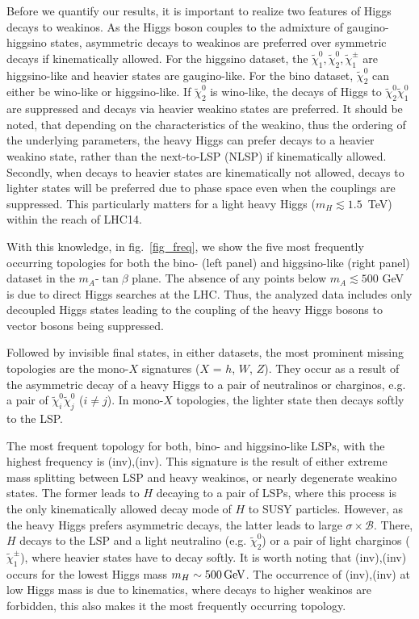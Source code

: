 \documentclass[11pt,a4paper]{article}
\begin{document}
Before we quantify our results, it is important to realize two features of Higgs decays to weakinos. As the Higgs boson couples to the admixture of gaugino-higgsino states, asymmetric decays to weakinos are preferred over symmetric decays if kinematically allowed. For the higgsino dataset, the $\tilde{\chi}^0_1, \tilde{\chi}^0_2, \tilde{\chi}^{\pm}_1$ are higgsino-like and heavier states are gaugino-like. For the bino dataset, $\tilde{\chi}^0_2$ can either be wino-like or higgsino-like. If $\tilde{\chi}^0_2$ is wino-like, the decays of Higgs to $\tilde{\chi}^0_2 \tilde{\chi}^0_1$ are suppressed and decays via heavier weakino states are preferred. It should be noted, that depending on the characteristics of the weakino, thus the ordering of the underlying parameters, the heavy Higgs can prefer decays to a heavier weakino state, rather than the next-to-LSP (NLSP) if kinematically allowed. Secondly, when decays to heavier states are kinematically not allowed, decays to lighter states will be preferred due to phase space even when the couplings are suppressed. This particularly matters for a light heavy Higgs ($m_H \lesssim 1.5$~TeV) within the reach of LHC14.

With this knowledge, in fig.~\ref{fig_freq}, we show the five most frequently occurring topologies for both the bino- (left panel) and higgsino-like (right panel) dataset in the $m_A$-$\tan\beta$ plane. The absence of any points below $m_A \lesssim 500$ GeV is due to direct Higgs searches at the LHC. Thus, the analyzed data includes only decoupled Higgs states leading to the coupling of the heavy Higgs bosons to vector bosons being suppressed.

Followed by invisible final states, in either datasets, the most prominent missing topologies are the mono-$X$ signatures ($X$ = $h$, $W$, $Z$). They occur as a result of the asymmetric decay of a heavy Higgs to a pair of neutralinos or charginos, e.g. a pair of $\tilde\chi^0_i\tilde\chi^0_j$ ($i \neq j$). In mono-$X$ topologies, the lighter state then decays softly to the LSP.

The most frequent topology for both, bino- and higgsino-like LSPs, with the highest frequency is (inv),(inv). This signature is the result of either extreme mass splitting between LSP and heavy weakinos, or nearly degenerate weakino states. The former leads to $H$ decaying to a pair of LSPs, where this process is the only kinematically allowed decay mode of $H$ to SUSY particles. However, as the heavy Higgs prefers asymmetric decays, the latter leads to large $\sigma\times\mathcal{B}$. There, $H$ decays to the LSP and a light neutralino (e.g. $\tilde{\chi}_2^0$) or a pair of light charginos ($\tilde{\chi}_1^\pm$), where heavier states have to decay softly. It is worth noting that (inv),(inv) occurs for the lowest Higgs mass $m_H \sim 500 \,\rm{GeV}$. The occurrence of (inv),(inv) at low Higgs mass is due to kinematics, where decays to higher weakinos are forbidden, this also makes it the most frequently occurring topology. 
\end{document}
